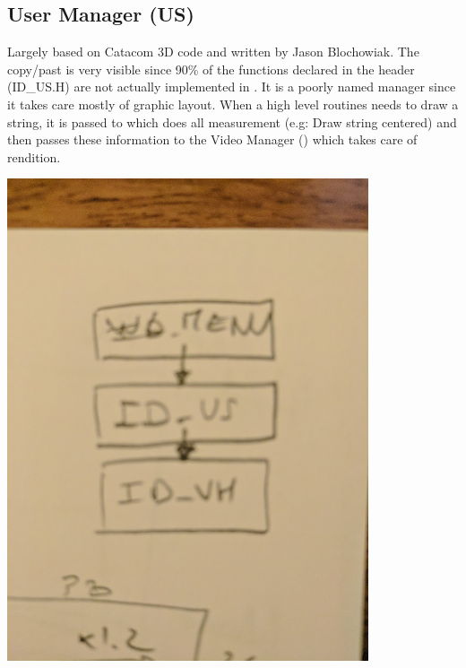 \documentclass[book.tex]{subfiles}
\begin{document}
\subsection{User Manager (US)}
\begin{minipage}{0.7\textwidth}
Largely based on Catacom 3D code and written by Jason Blochowiak. The copy/past is very visible since 90\% of the functions declared in the header (ID\_US.H) are not actually implemented in . 
It is a poorly named manager since it takes care mostly of graphic layout. When a  high level routines needs to draw a string, it is passed to  which does all measurement (e.g: Draw string centered)
and then passes these information to the Video Manager () which takes care of rendition.
\end{minipage}
\begin{minipage}{0.3\textwidth}
\begin{flushright}
\includegraphics[width=0.8\textwidth]{imgs/drawings/US_explained.png}
\end{flushright}
\end{minipage}
\noindent
\\
\end{document}
